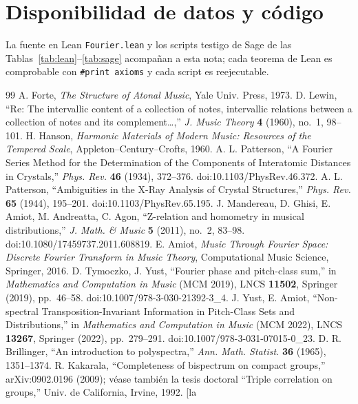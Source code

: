 \documentclass[11pt]{article}
\newcommand{\lean}[1]{\texttt{#1}}
\begin{document}
\section*{Disponibilidad de datos y código}
La fuente en Lean \lean{Fourier.lean} y los scripts testigo de Sage de las
Tablas~\ref{tab:lean}--\ref{tab:sage} acompañan a esta nota; cada teorema de Lean es comprobable con
\lean{\#print axioms} y cada script es reejecutable.

\begin{thebibliography}{99}
 A. Forte, \emph{The Structure of Atonal Music}, Yale Univ. Press, 1973.
 D. Lewin, ``Re: The intervallic content of a collection of notes, intervallic relations
  between a collection of notes and its complement\dots,'' \emph{J. Music Theory} \textbf{4} (1960),
  no.~1, 98--101.
 H. Hanson, \emph{Harmonic Materials of Modern Music: Resources of the Tempered Scale},
  Appleton--Century--Crofts, 1960.
 A. L. Patterson, ``A Fourier Series Method for the Determination of the Components of
  Interatomic Distances in Crystals,'' \emph{Phys. Rev.} \textbf{46} (1934), 372--376.
  doi:10.1103/PhysRev.46.372.
 A. L. Patterson, ``Ambiguities in the X-Ray Analysis of Crystal Structures,''
  \emph{Phys. Rev.} \textbf{65} (1944), 195--201. doi:10.1103/PhysRev.65.195.
 J. Mandereau, D. Ghisi, E. Amiot, M. Andreatta, C. Agon, ``Z-relation and homometry in
  musical distributions,'' \emph{J. Math. \& Music} \textbf{5} (2011), no.~2, 83--98.
  doi:10.1080/17459737.2011.608819.
 E. Amiot, \emph{Music Through Fourier Space: Discrete Fourier Transform in Music Theory},
  Computational Music Science, Springer, 2016.
 D. Tymoczko, J. Yust, ``Fourier phase and pitch-class sum,'' in \emph{Mathematics and
  Computation in Music} (MCM 2019), LNCS \textbf{11502}, Springer (2019), pp.~46--58.
  doi:10.1007/978-3-030-21392-3\_4.
 J. Yust, E. Amiot, ``Non-spectral Transposition-Invariant Information in Pitch-Class Sets and
  Distributions,'' in \emph{Mathematics and Computation in Music} (MCM 2022), LNCS \textbf{13267}, Springer
  (2022), pp.~279--291. doi:10.1007/978-3-031-07015-0\_23.
 D. R. Brillinger, ``An introduction to polyspectra,'' \emph{Ann. Math. Statist.}
  \textbf{36} (1965), 1351--1374.
 R. Kakarala, ``Completeness of bispectrum on compact groups,'' arXiv:0902.0196 (2009);
  véase también la tesis doctoral ``Triple correlation on groups,'' Univ. de California, Irvine, 1992. [la

\end{thebibliography}
\end{document}
